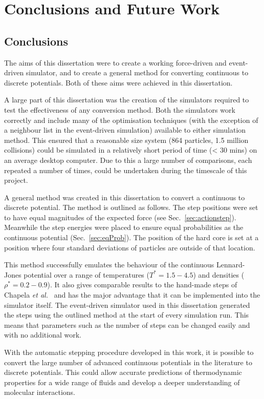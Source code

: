 \documentclass[12pt]{UoAthesis} \usepackage{booktabs}
\begin{document}
\printbibliography[heading=thesisChapterBib] 
\chapter{Conclusions and Future Work}
\section{Conclusions}
The aims of this dissertation were to create a working force-driven
and event-driven simulator, and to create a general method for
converting continuous to discrete potentials.  Both of these aims were
achieved in this dissertation.

A large part of this dissertation was the creation of the simulators
required to test the effectiveness of any conversion method.  Both the
simulators work correctly and include many of the optimisation
techniques (with the exception of a neighbour list in the event-driven
simulation) available to either simulation method.  This ensured that
a reasonable size system (864 particles, 1.5 million collisions) could
be simulated in a relatively short period of time (< 30 mins) on an
average desktop computer. Due to this a large number of comparisons,
each repeated a number of times, could be undertaken during the
timescale of this project.

A general method was created in this dissertation to convert a
continuous to discrete potential.  The method is outlined as
follows. The step positions were set to have equal magnitudes of the
expected force (see Sec.~\ref{sec:actionstep}). Meanwhile the step
energies were placed to ensure equal probabilities as the continuous
potential (Sec.~\ref{sec:eqProb}). The position of the hard core is
set at a position where four standard deviations of particles are
outside of that location.

This method successfully emulates the behaviour of the continuous
Lennard-Jones potential over a range of temperatures ($T^*=1.5-4.5$)
and densities ($\rho^*=0.2-0.9$).  It also gives comparable results to
the hand-made steps of Chapela \textit{et al.}~\cite{Chapela1989} and
has the major advantage that it can be implemented into the
simulator itself.  The event-driven simulator used in this
dissertation generated the steps using the outlined method at the
start of every simulation run.  This means that parameters such as the
number of steps can be changed easily and with no additional work.

With the automatic stepping procedure developed in this work, it is
possible to convert the large number of advanced continuous potentials
in the literature to discrete potentials.  This could allow accurate
predictions of thermodynamic properties for a wide range of fluids and
develop a deeper understanding of molecular interactions.
\end{document}
